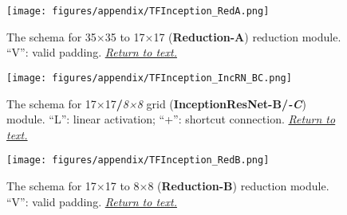 \begin{multicols}{2}
    
    
    \begin{minipage}{\columnwidth}
        \begin{figure}[H]
        \begin{center}
        \texttt{[image: figures/appendix/TFInception\_RedA.png]}
        \caption{The schema for 35×35 to 17×17 (\textbf{Reduction-A}) reduction module. ``V'': valid padding.
        \newline
        \protect\hyperref[fig:Arch_IncRN2]{\textit{Return to text.}}}
        \space\label{fig:IncRN2_RedA}
        \end{center}
        \end{figure}
        \end{minipage}
    
    \begin{minipage}{\columnwidth}
        \begin{figure}[H]
        \begin{center}
        \texttt{[image: figures/appendix/TFInception\_IncRN\_BC.png]}
        \caption{The schema for 17×17{\fontsize{12}{12}\selectfont \textbf{/}}\textit{8×8} grid (\textbf{InceptionResNet-B{\fontsize{12}{12}\selectfont \textbf{/}}\textit{-C}}) module. 
        ``L'': linear activation; ``+'': shortcut connection.
        \newline
        \protect\hyperref[fig:Arch_IncRN2]{\textit{Return to text.}}}
        \space\label{fig:IncRN2_IncBC}
        \end{center}
        \end{figure}
        \end{minipage}
    
    \begin{minipage}{\columnwidth}
        \begin{figure}[H]
        \begin{center}
        \texttt{[image: figures/appendix/TFInception\_RedB.png]}
        \caption{The schema for 17×17 to 8×8 (\textbf{Reduction-B}) reduction module. ``V'': valid padding.
        \newline
        \protect\hyperref[fig:Arch_IncRN2]{\textit{Return to text.}}}
        \space\label{fig:IncRN2_RedB}
        \end{center}
        \end{figure}
        \end{minipage}   
    
    \end{multicols}
    
